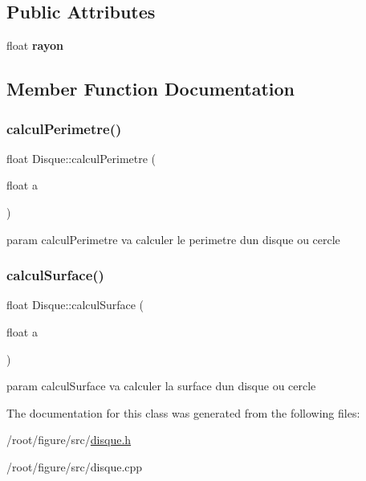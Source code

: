 \subsection*{Public Attributes}
\begin{DoxyCompactItemize}
\item 
\mbox{\label{classDisque_a50ee9a093fd89c4519ca9a782f0161de}} 
float {\bfseries rayon}
\end{DoxyCompactItemize}


\subsection{Member Function Documentation}
\mbox{\label{classDisque_a699609023203ea173b117df83f5c55bd}} 
\subsubsection{\texorpdfstring{calcul\+Perimetre()}{calculPerimetre()}}
{\footnotesize\ttfamily float Disque\+::calcul\+Perimetre (\begin{DoxyParamCaption}\item[{float}]{a }\end{DoxyParamCaption})}

param calcul\+Perimetre va calculer le perimetre d\textquotesingle{}un disque ou cercle \mbox{\label{classDisque_a6a721908949195bc8c8c0388c034b30a}} 
\subsubsection{\texorpdfstring{calcul\+Surface()}{calculSurface()}}
{\footnotesize\ttfamily float Disque\+::calcul\+Surface (\begin{DoxyParamCaption}\item[{float}]{a }\end{DoxyParamCaption})}

param calcul\+Surface va calculer la surface d\textquotesingle{}un disque ou cercle 

The documentation for this class was generated from the following files\+:\begin{DoxyCompactItemize}
\item 
/root/figure/src/\hyperlink{disque_8h}{disque.\+h}\item 
/root/figure/src/disque.\+cpp\end{DoxyCompactItemize}
